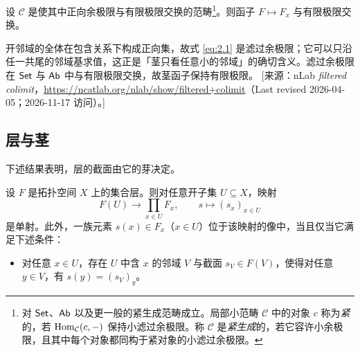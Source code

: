 \begin{remark}\label{rem:2.1.3}
设 $\mathcal C$ 是使其中正向余极限与有限极限交换的范畴\footnote{对 $\mathsf{Set}$、$\mathsf{Ab}$ 以及更一般的紧生成范畴成立。局部小范畴 $\mathcal C$ 中的对象 $c$ 称为\emph{紧}的，若 $\operatorname{Hom}_{\mathcal C}(c,-)$ 保持小滤过余极限。称 $\mathcal C$ 是\emph{紧生成}的，若它容许小余极限，且其中每个对象都同构于紧对象的小滤过余极限。}。则函子 $F\mapsto F_x$ 与有限极限交换。
\end{remark}

\begin{yizhu}
开邻域的全体在包含关系下构成正向集，故式 \eqref{eq:2.1} 是滤过余极限；它可以只沿任一共尾的邻域基求值，这正是「茎只看任意小的邻域」的确切含义。滤过余极限在 $\mathsf{Set}$ 与 $\mathsf{Ab}$ 中与有限极限交换，故茎函子保持有限极限。
[来源：nLab \emph{filtered colimit}，\url{https://ncatlab.org/nlab/show/filtered+colimit}（Last revised 2026-04-05；2026-11-17 访问）。]
\end{yizhu}

\subsection{层与茎}\label{sec:2.2}

下述结果表明，层的截面由它的芽决定。

\begin{lemma}\label{lem:2.2.1}
设 $F$ 是拓扑空间 $X$ 上的集合层。则对任意开子集 $U\subseteq X$，映射
\begin{equation}\tag{2.3}\label{eq:2.3}
F(U)\to\prod_{x\in U}F_x,\qquad s\mapsto (s_x)_{x\in U}
\end{equation}
是单射。此外，一族元素 $s(x)\in F_x$（$x\in U$）位于该映射的像中，当且仅当它满足下述条件：
\begin{itemize}
  \item[$(***)$] 对任意 $x\in U$，存在 $U$ 中含 $x$ 的邻域 $V$ 与截面 $s_V\in F(V)$，使得对任意 $y\in V$，有 $s(y)=(s_V)_y$。
\end{itemize}
\end{lemma}

